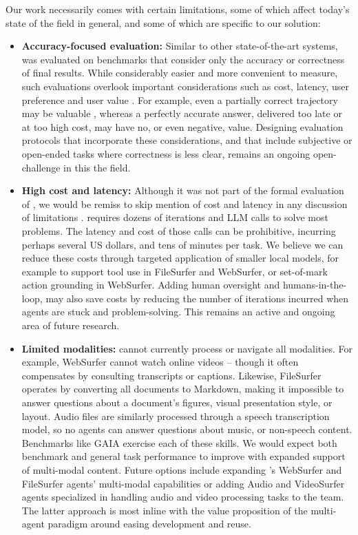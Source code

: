 Our work necessarily comes with certain limitations, some of which affect today's state of the field in general, and some of which are specific to our solution:



\begin{itemize}
    \item \textbf{Accuracy-focused evaluation:} Similar to other state-of-the-art systems, \team{} was evaluated on benchmarks that consider only the accuracy or correctness of final results. While considerably easier and more convenient to measure, such evaluations overlook  important considerations such as cost, latency, user preference and user value \cite{kapoor2024aiagentsmatter}. For example, even a partially correct trajectory may be valuable \cite{dibia-etal-2023-aligning}, whereas a perfectly accurate answer, delivered too late or at too high cost, may have no, or even negative, value. Designing evaluation protocols that incorporate these considerations, and that include subjective or open-ended tasks where correctness is less clear, remains an ongoing open-challenge in this the field.  
    \item \textbf{High cost and latency:} Although it was not part of the formal evaluation of \team, we would be remiss to skip mention of cost and latency in any discussion of limitations \cite{kapoor2024aiagentsmatter}. \team requires dozens of iterations and LLM calls to solve most problems. The latency and cost of those calls can be prohibitive, incurring perhaps several US dollars, and tens of minutes per task. We believe we can reduce these costs through targeted application of smaller local models, for example to support tool use in FileSurfer and WebSurfer, or set-of-mark action grounding in WebSurfer. Adding human oversight and humans-in-the-loop, may also save costs by reducing the number of iterations incurred when agents are stuck and problem-solving. This remains an active and ongoing area of future research.
    \item \textbf{Limited modalities:} \team cannot currently process or navigate all modalities. For example, WebSurfer cannot watch online videos -- though it often compensates by consulting transcripts or captions. Likewise, FileSurfer operates by converting all documents to Markdown, making it impossible to answer questions about a document's figures, visual presentation style, or layout. Audio files are similarly processed through a speech transcription model, so no agents can answer questions about music, or non-speech content. Benchmarks like GAIA exercise each of these skills. We would expect both benchmark and general task performance to improve with expanded support of multi-modal content. Future options include expanding \team's WebSurfer and FileSurfer agents' multi-modal capabilities or adding Audio and VideoSurfer agents specialized in handling audio and video processing tasks to the \team team. The latter approach is most inline with the value proposition of the multi-agent paradigm around easing development and reuse.      

\end{itemize}
